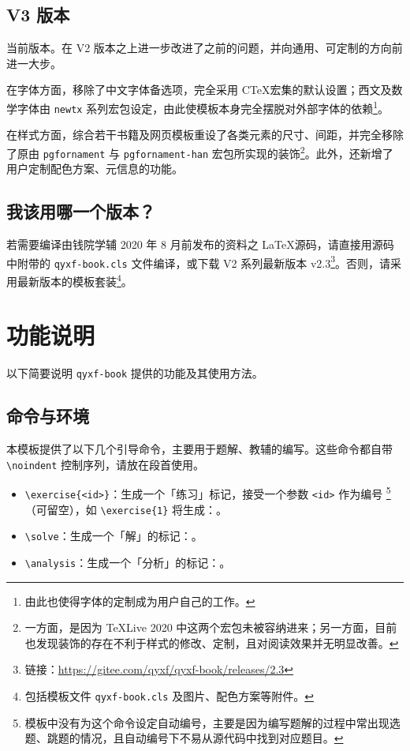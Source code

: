 \documentclass[
    10pt,
    oneside,
    openany,
    b5paper,
    colorscheme = black  %
]{qyxf-book}
\begin{document}
\subsection{V3 版本}

当前版本。在 V2 版本之上进一步改进了之前的问题，并向通用、可定制的方向前进一大步。

在字体方面，移除了中文字体备选项，完全采用 C\TeX 宏集的默认设置；西文及数学字体由 \verb|newtx| 系列宏包设定，由此使模板本身完全摆脱对外部字体的依赖\footnote{由此也使得字体的定制成为用户自己的工作。}。

在样式方面，综合若干书籍及网页模板重设了各类元素的尺寸、间距，并完全移除了原由 \verb|pgfornament| 与 \verb|pgfornament-han| 宏包所实现的装饰\footnote{一方面，是因为 \TeX Live 2020 中这两个宏包未被容纳进来；另一方面，目前也发现装饰的存在不利于样式的修改、定制，且对阅读效果并无明显改善。}。此外，还新增了用户定制配色方案、元信息的功能。

\subsection{我该用哪一个版本？}

若需要编译由钱院学辅 2020 年 8 月前发布的资料之 \LaTeX 源码，请直接用源码中附带的 \verb|qyxf-book.cls| 文件编译，或下载 V2 系列最新版本 v2.3\footnote{链接：\url{https://gitee.com/qyxf/qyxf-book/releases/2.3}}。否则，请采用最新版本的模板套装\footnote{包括模板文件 \texttt{qyxf-book.cls} 及图片、配色方案等附件。}。

\section{功能说明}

以下简要说明 \verb|qyxf-book| 提供的功能及其使用方法。

\subsection{命令与环境}

本模板提供了以下几个引导命令，主要用于题解、教辅的编写。这些命令都自带 \verb|\noindent| 控制序列，请放在段首使用。

\begin{itemize}
  \item \verb|\exercise{<id>}|：生成一个「练习」标记，接受一个参数 \verb|<id>| 作为编号
  \footnote{模板中没有为这个命令设定自动编号，主要是因为编写题解的过程中常出现选题、跳题的情况，且自动编号下不易从源代码中找到对应题目。}
  （可留空），如 \verb|\exercise{1}| 将生成：。
  \item \verb|\solve|：生成一个「解」的标记：\solve。
  \item \verb|\analysis|：生成一个「分析」的标记：\analysis。
\end{itemize}
\end{document}

